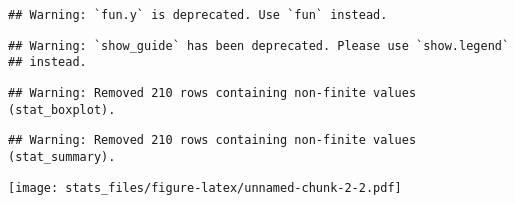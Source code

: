 \documentclass[
]{article}
\begin{document}
\begin{verbatim}
## Warning: `fun.y` is deprecated. Use `fun` instead.
\end{verbatim}

\begin{verbatim}
## Warning: `show_guide` has been deprecated. Please use `show.legend`
## instead.
\end{verbatim}

\begin{verbatim}
## Warning: Removed 210 rows containing non-finite values (stat_boxplot).
\end{verbatim}

\begin{verbatim}
## Warning: Removed 210 rows containing non-finite values (stat_summary).
\end{verbatim}

\texttt{[image: stats\_files/figure-latex/unnamed-chunk-2-2.pdf]}
\end{document}
